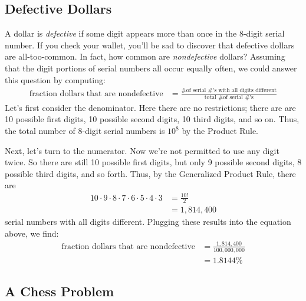 \subsection{Defective Dollars}

A dollar is \emph{defective} if some digit appears more than once in
the 8-digit serial number.  If you check your wallet, you'll be sad to
discover that defective dollars are all-too-common.  In fact, how
common are \emph{nondefective} dollars?  Assuming that the digit
portions of serial numbers all occur equally often, we could answer
this question by computing:
%
\begin{align*}
\text{fraction dollars that are nondefective}
    & = \frac{\text{\# of serial \#'s with all digits different}}
             {\text{total \# of serial \#'s}}
\end{align*}
%
Let's first consider the denominator.  Here there are no restrictions;
there are are 10 possible first digits, 10 possible second digits, 10
third digits, and so on.  Thus, the total number of 8-digit serial
numbers is $10^8$ by the Product Rule.

Next, let's turn to the numerator.  Now we're not permitted to use any
digit twice.  So there are still 10 possible first digits, but only 9
possible second digits, 8 possible third digits, and so forth.  Thus, by
the Generalized Product Rule, there are
%
\begin{align*}
10 \cdot 9 \cdot 8 \cdot 7 \cdot 6 \cdot 5 \cdot 4 \cdot 3
    & = \frac{10!}{2} \\
    & = 1,814,400
\end{align*}
%
serial numbers with all digits different.  Plugging these results into
the equation above, we find:
%
\begin{align*}
\text{fraction dollars that are nondefective}
    & = \frac{1,814,400}{100,000,000} \\
    & = 1.8144\%
\end{align*}

\subsection{A Chess Problem}

